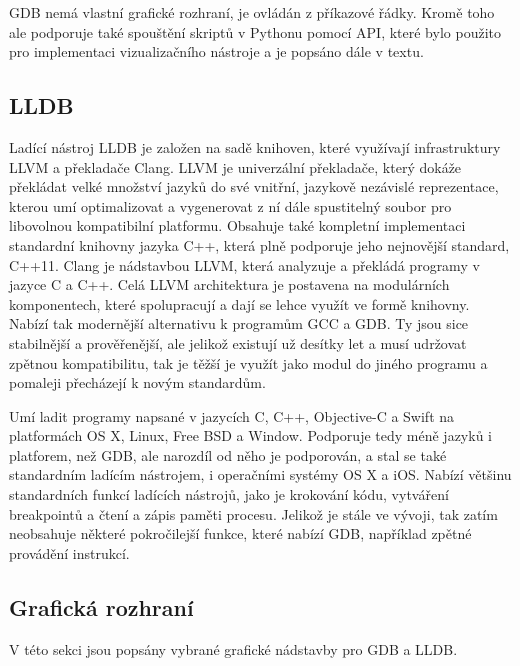 \documentclass[bc,male,java,dept460]{diploma}						%
\begin{document}
		GDB nemá vlastní grafické rozhraní, je ovládán z příkazové řádky. Kromě toho ale podporuje také spouštění skriptů v Pythonu pomocí API,
		které bylo použito pro implementaci vizualizačního nástroje a je popsáno dále v textu.
	\subsection{LLDB}
		Ladící nástroj LLDB je založen na sadě knihoven, které využívají infrastruktury LLVM a překladače Clang. LLVM je univerzální překladače, který dokáže
		překládat velké množství jazyků do své vnitřní, jazykově nezávislé reprezentace, kterou umí optimalizovat a vygenerovat z ní dále spustitelný soubor
		pro libovolnou kompatibilní platformu\cite{llvm}. Obsahuje také kompletní implementaci standardní knihovny jazyka C++, která plně podporuje jeho nejnovější
		standard, C++11. Clang je nádstavbou LLVM, která analyzuje a překládá programy v jazyce C a C++. Celá LLVM architektura
		je postavena na modulárních komponentech, které spolupracují a dají se lehce využít ve formě knihovny. Nabízí tak modernější alternativu k programům
		GCC a GDB. Ty jsou sice stabilnější a prověřenější, ale jelikož existují už desítky let a musí udržovat zpětnou kompatibilitu, tak je těžší je
		využít jako modul do jiného programu a pomaleji přecházejí k novým standardům.
		
		\vspace{5mm}
		
		\par Umí ladit programy napsané v jazycích C, C++, Objective-C a Swift na platformách OS X, Linux, Free BSD a Window. Podporuje tedy méně jazyků i platforem,
		než GDB, ale narozdíl od něho je podporován, a stal se také standardním ladícím nástrojem, i operačními systémy OS X a iOS. Nabízí většinu standardních
		funkcí ladících nástrojů, jako je krokování kódu, vytváření breakpointů a čtení a zápis paměti procesu. Jelikož je stále ve vývoji, tak zatím neobsahuje 
		některé pokročilejší funkce, které nabízí GDB, například zpětné provádění instrukcí.

	\subsection{Grafická rozhraní}
		V této sekci jsou popsány vybrané grafické nádstavby pro GDB a LLDB.
	
\end{document}
